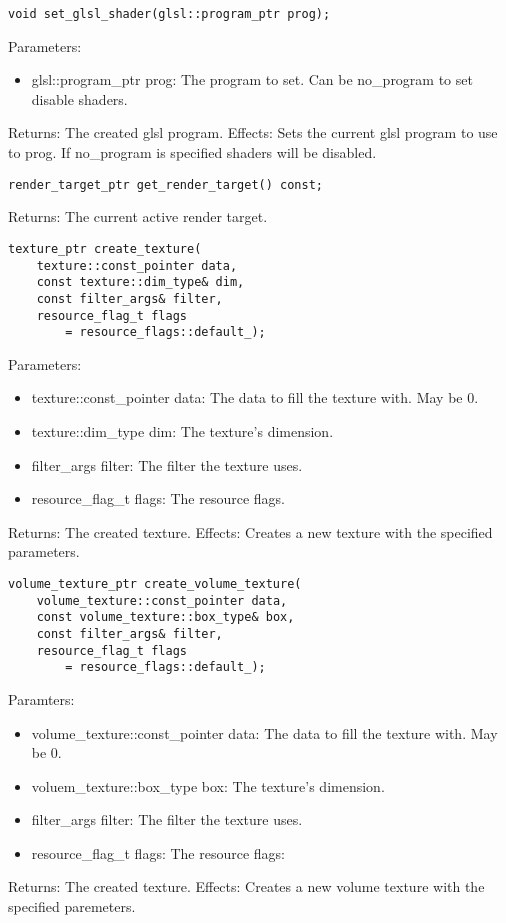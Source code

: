 \documentclass{article}
\begin{document}
\begin{lstlisting}
void set_glsl_shader(glsl::program_ptr prog);
\end{lstlisting}
Parameters:
\begin{itemize}
\item glsl::program\_ptr prog: The program to set. Can be no\_program to set disable shaders.
\end{itemize}
Returns: The created glsl program.
Effects: Sets the current glsl program to use to prog. If no\_program is specified shaders will be disabled.

\begin{lstlisting}
render_target_ptr get_render_target() const;
\end{lstlisting}
Returns: The current active render target.

\begin{lstlisting}
texture_ptr create_texture(
	texture::const_pointer data,
	const texture::dim_type& dim,
	const filter_args& filter,
	resource_flag_t flags
		= resource_flags::default_);
\end{lstlisting}
Parameters:
\begin{itemize}
\item texture::const\_pointer data: The data to fill the texture with. May be 0.
\item texture::dim\_type dim: The texture's dimension.
\item filter\_args filter: The filter the texture uses.
\item resource\_flag\_t flags: The resource flags.
\end{itemize}
Returns: The created texture.
Effects: Creates a new texture with the specified parameters.

\begin{lstlisting}
volume_texture_ptr create_volume_texture(
	volume_texture::const_pointer data,
	const volume_texture::box_type& box,
	const filter_args& filter,
	resource_flag_t flags
		= resource_flags::default_);
\end{lstlisting}
Paramters:
\begin{itemize}
\item volume\_texture::const\_pointer data: The data to fill the texture with. May be 0.
\item voluem\_texture::box\_type box: The texture's dimension.
\item filter\_args filter: The filter the texture uses.
\item resource\_flag\_t flags: The resource flags:
\end{itemize}
Returns: The created texture.
Effects: Creates a new volume texture with the specified paremeters.
\end{document}
